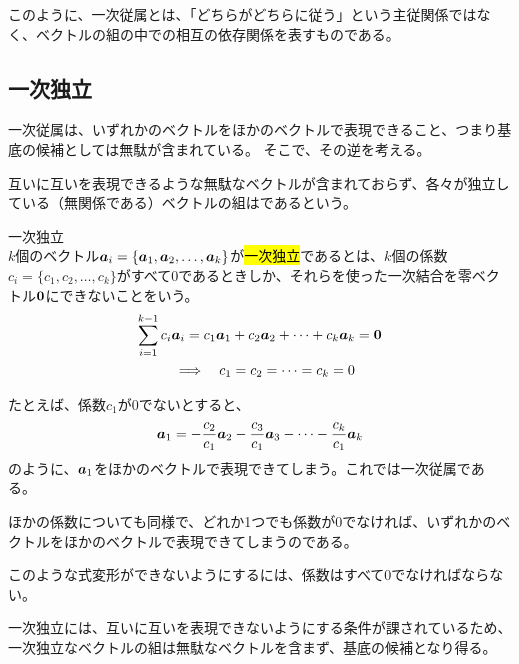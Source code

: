 \documentclass[../../imaging-math]{subfiles}
\begin{document}
このように、一次従属とは、「どちらがどちらに従う」という主従関係ではなく、ベクトルの組の中での相互の依存関係を表すものである。

\subsection{一次独立}

一次従属は、いずれかのベクトルをほかのベクトルで表現できること、つまり基底の候補としては無駄が含まれている。
そこで、その逆を考える。

\br

互いに互いを表現できるような無駄なベクトルが含まれておらず、各々が独立している（無関係である）ベクトルの組はであるという。

\begin{definition}{一次独立}\quad\\
  $k$個のベクトル$\vb*{a}_i = \{ \vb*{a}_1, \vb*{a}_2, \ldots, \vb*{a}_k \}$が\hl{一次独立}であるとは、$k$個の係数$c_i = \{c_1, c_2, \ldots, c_k\}$がすべて$0$であるときしか、それらを使った一次結合を零ベクトル$\vb{0}$にできないことをいう。
  \large
  \begin{gather*}
    \sum_{i=1}^{k-1} c_i \vb*{a}_i = c_1 \vb*{a}_1 + c_2 \vb*{a}_2 + \cdots + c_k\vb*{a}_{k} = \vb{0} \\ \quad\Longrightarrow \quad c_1 = c_2 = \cdots = c_k = 0
  \end{gather*}
\end{definition}

たとえば、係数$c_1$が$0$でないとすると、
\begin{equation*}
  \vb*{a}_1 = -\frac{c_2}{c_1} \vb*{a}_2 - \frac{c_3}{c_1} \vb*{a}_3 - \cdots - \frac{c_k}{c_1} \vb*{a}_{k}
\end{equation*}
のように、$\vb*{a}_1$をほかのベクトルで表現できてしまう。これでは一次従属である。

ほかの係数についても同様で、どれか1つでも係数が$0$でなければ、いずれかのベクトルをほかのベクトルで表現できてしまうのである。

このような式変形ができないようにするには、係数はすべて$0$でなければならない。

\br

一次独立には、互いに互いを表現できないようにする条件が課されているため、一次独立なベクトルの組は無駄なベクトルを含まず、基底の候補となり得る。
\end{document}
